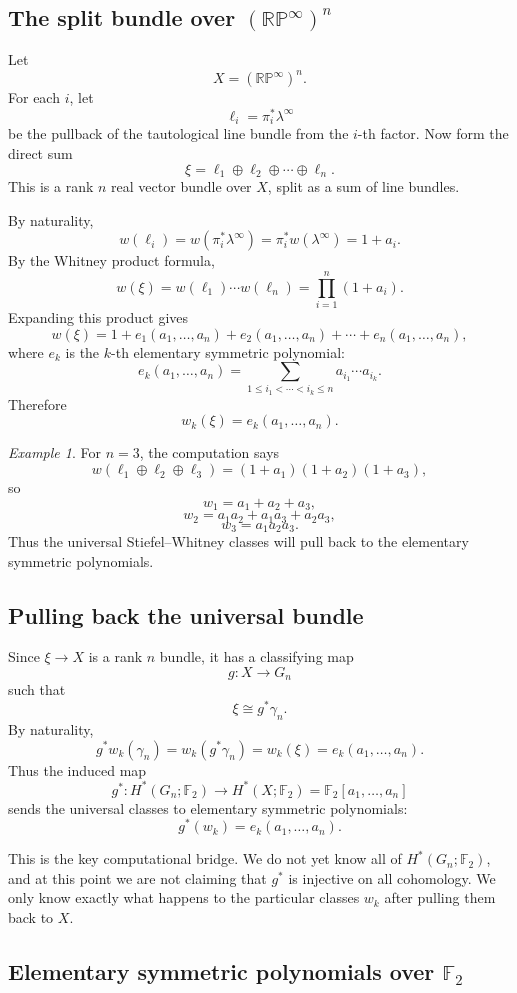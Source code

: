 \documentclass[11pt]{article}
\theoremstyle{remark}
\newtheorem{example}[theorem]{Example}
\newcommand{\F}{\mathbb F}
\newcommand{\RP}{\mathbb{RP}}
\newcommand{\Gn}{G_n}
\newcommand{\gamman}{\gamma_n}
\newcommand{\lambdainf}{\lambda^\infty}
\begin{document}
\subsection{The split bundle over $(\RP^\infty)^n$}

Let
\[
  X=(\RP^\infty)^n.
\]
For each $i$, let
\[
  \ell_i=\pi_i^*\lambdainf
\]
be the pullback of the tautological line bundle from the $i$-th factor.  Now form the direct sum
\[
  \xi=\ell_1\oplus\ell_2\oplus\cdots\oplus\ell_n.
\]
This is a rank $n$ real vector bundle over $X$, split as a sum of line bundles.

By naturality,
\[
  w(\ell_i)=w(\pi_i^*\lambdainf)=\pi_i^*w(\lambdainf)=1+a_i.
\]
By the Whitney product formula,
\[
  w(\xi)=w(\ell_1)\cdots w(\ell_n)=\prod_{i=1}^n(1+a_i).
\]
Expanding this product gives
\[
  w(\xi)=1+e_1(a_1,\dots,a_n)+e_2(a_1,\dots,a_n)+\cdots+e_n(a_1,\dots,a_n),
\]
where $e_k$ is the $k$-th elementary symmetric polynomial:
\[
  e_k(a_1,\dots,a_n)=\sum_{1\le i_1<\cdots<i_k\le n}a_{i_1}\cdots a_{i_k}.
\]
Therefore
\[
  w_k(\xi)=e_k(a_1,\dots,a_n).
\]

\begin{example}
For $n=3$, the computation says
\[
  w(\ell_1\oplus\ell_2\oplus\ell_3)=(1+a_1)(1+a_2)(1+a_3),
\]
so
\[
  w_1=a_1+a_2+a_3,
\]
\[
  w_2=a_1a_2+a_1a_3+a_2a_3,
\]
\[
  w_3=a_1a_2a_3.
\]
Thus the universal Stiefel--Whitney classes will pull back to the elementary symmetric polynomials.
\end{example}

\subsection{Pulling back the universal bundle}

Since $\xi\to X$ is a rank $n$ bundle, it has a classifying map
\[
  g:X\to \Gn
\]
such that
\[
  \xi\cong g^*\gamman.
\]
By naturality,
\[
  g^*w_k(\gamman)=w_k(g^*\gamman)=w_k(\xi)=e_k(a_1,\dots,a_n).
\]
Thus the induced map
\[
  g^*:H^*(\Gn;\F_2)\to H^*(X;\F_2)=\F_2[a_1,\dots,a_n]
\]
sends the universal classes to elementary symmetric polynomials:
\[
  g^*(w_k)=e_k(a_1,\dots,a_n).
\]

This is the key computational bridge.  We do not yet know all of $H^*(\Gn;\F_2)$, and at this point we are not claiming that $g^*$ is injective on all cohomology.  We only know exactly what happens to the particular classes $w_k$ after pulling them back to $X$.

\subsection{Elementary symmetric polynomials over $\F_2$}
\end{document}
